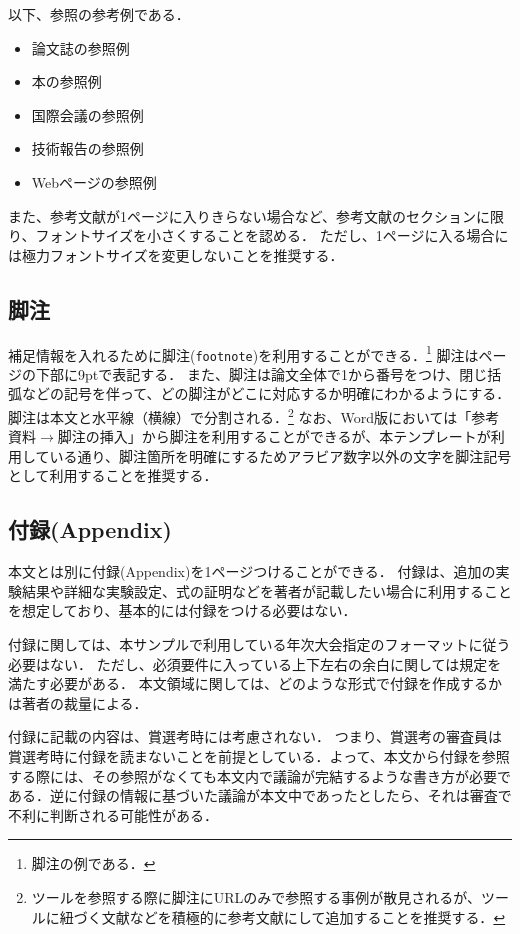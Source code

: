 \documentclass[
  platex, dvipdfmx,  %
]{nlp2021}
\newcommand{\code}[1]{\texttt{#1}}
\begin{document}
以下、参照の参考例である．
\begin{itemize}
\item 論文誌の参照例 \cite{Article_01}
\item 本の参照例 \cite{Book_02}
\item 国際会議の参照例 \cite{Inproc_03}
\item 技術報告の参照例 \cite{Techrep_05}
\item Webページの参照例 \cite{Web_06}
\end{itemize}

また、参考文献が1ページに入りきらない場合など、参考文献のセクションに限り、フォントサイズを小さくすることを認める．
ただし、1ページに入る場合には極力フォントサイズを変更しないことを推奨する．

\subsection{脚注}
補足情報を入れるために脚注(\code{footnote})を利用することができる．\footnote{脚注の例である．}
脚注はページの下部に9ptで表記する．
また、脚注は論文全体で1から番号をつけ、閉じ括弧などの記号を伴って、どの脚注がどこに対応するか明確にわかるようにする．
脚注は本文と水平線（横線）で分割される．\footnote{ツールを参照する際に脚注にURLのみで参照する事例が散見されるが、ツールに紐づく文献などを積極的に参考文献にして追加することを推奨する．}
なお、Word版においては「参考資料$\xrightarrow{}$脚注の挿入」から脚注を利用することができるが、本テンプレートが利用している通り、脚注箇所を明確にするためアラビア数字以外の文字を脚注記号として利用することを推奨する．



\subsection{付録(Appendix)}
\label{sec:appendix}
本文とは別に付録(Appendix)を1ページつけることができる．
付録は、追加の実験結果や詳細な実験設定、式の証明などを著者が記載したい場合に利用することを想定しており、基本的には付録をつける必要はない．

付録に関しては、本サンプルで利用している年次大会指定のフォーマットに従う必要はない．
ただし、必須要件に入っている上下左右の余白に関しては規定を満たす必要がある．
本文領域に関しては、どのような形式で付録を作成するかは著者の裁量による．

付録に記載の内容は、賞選考時には考慮されない．
つまり、賞選考の審査員は賞選考時に付録を読まないことを前提としている．よって、本文から付録を参照する際には、その参照がなくても本文内で議論が完結するような書き方が必要である．逆に付録の情報に基づいた議論が本文中であったとしたら、それは審査で不利に判断される可能性がある．
\end{document}
